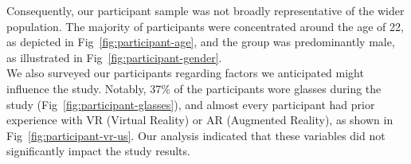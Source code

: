 Consequently, our participant sample was not broadly representative of the wider population. The majority of participants were concentrated around the age of 22, as depicted in Fig~\ref{fig:participant-age}, and the group was predominantly male, as illustrated in Fig~\ref{fig:participant-gender}. \\

We also surveyed our participants regarding factors we anticipated might influence the study. Notably, 37\% of the participants wore glasses during the study (Fig~\ref{fig:participant-glasses}), and almost every participant had prior experience with VR (Virtual Reality) or AR (Augmented Reality), as shown in Fig~\ref{fig:participant-vr-us}. Our analysis indicated that these variables did not significantly impact the study results.

\begin{invisBox}
	\hfill
\end{invisBox}
